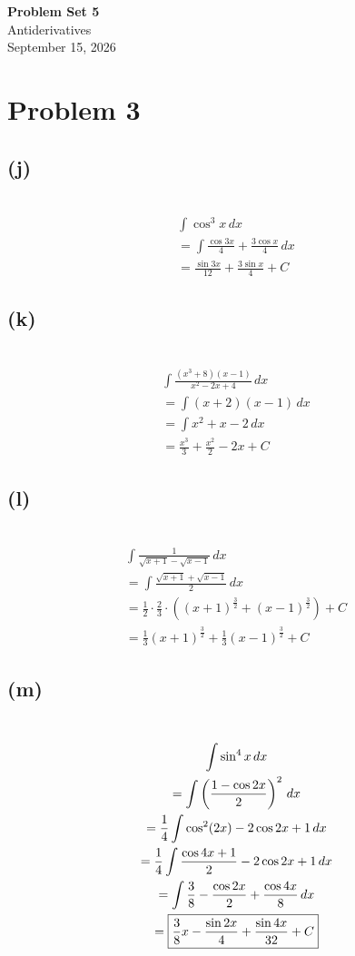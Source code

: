 \documentclass[12pt]{article}
\newcommand*{\paren}[1]{\ensuremath\left(#1\right)}
\newcommand{\problem}[1]{\section{Problem #1}}
\newcommand{\subproblem}[1]{\subsection{(#1)} \,}
\begin{document}
\vspace*{0cm}

\begin{center}
    {\Large \bfseries Problem Set 5} \\[0.5cm]
    {\large Antiderivatives} \\[0.35cm]
    {\normalsize September 15, 2026}
\end{center}


\problem{3}

\subproblem{j} 
\begin{gather*}
    \int \cos^3 x \, dx\\
    =\int \frac{\cos 3x}{4}+\frac{3\cos x}{4} \, dx\\
    =\boxed{\frac{\sin 3x}{12}+\frac{3\sin x}{4}+C}
\end{gather*}

\subproblem{k}
\begin{gather*}
    \int \frac{(x^3+8)(x-1)}{x^2-2x+4} \, dx\\
    =\int (x+2)(x-1) \, dx\\
    =\int x^2+x-2 \, dx\\
    =\boxed{\frac{x^3}{3}+\frac{x^2}{2}-2x+C}
\end{gather*}

\subproblem{l}
\begin{gather*}
    \int \frac{1}{\sqrt{x+1}-\sqrt{x-1}} \, dx\\
    =\int \frac{\sqrt{x+1}+\sqrt{x-1}}{2} \, dx\\
    =\frac{1}{2}\cdot \frac{2}{3} \cdot ((x+1)^\frac{3}{2}+(x-1)^\frac{3}{2})+C\\
    =\boxed{\frac{1}{3}(x+1)^\frac{3}{2}+\frac{1}{3}(x-1)^\frac{3}{2}+C}
\end{gather*}

\subproblem{m}
\begin{gather*}
    \int \sin^4 x \, dx\\
    =\int \paren{\frac{1-\cos 2x}{2}}^2 \, dx\\
    =\frac{1}{4}\int \cos^2(2x)-2\cos 2x+1\, dx\\
    =\frac{1}{4}\int \frac{\cos 4x+1}{2}-2\cos 2x+1 \, dx\\
    =\int \frac{3}{8}  - \frac{\cos 2x}{2} + \frac{\cos 4x}{8} \, dx\\
    =\boxed{\frac{3}{8}x- \frac{\sin 2x}{4}+ \frac{\sin 4x}{32}+C}
\end{gather*}
\end{document}
